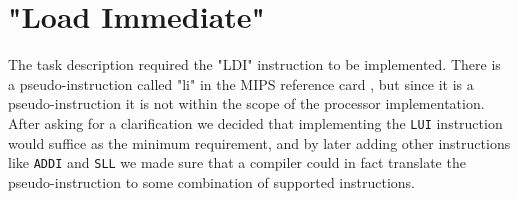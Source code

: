 \section{"Load Immediate"}
The task description required the "LDI" instruction to be implemented.
There is a pseudo-instruction called "li" in the MIPS reference card \cite{bib:compendium},
but since it is a pseudo-instruction it is not within the scope of the processor implementation.
After asking for a clarification we decided that implementing the \texttt{LUI} instruction would suffice as the minimum requirement,
and by later adding other instructions like \texttt{ADDI} and \texttt{SLL} we made sure that a compiler could in fact translate the pseudo-instruction to some combination of supported instructions.
